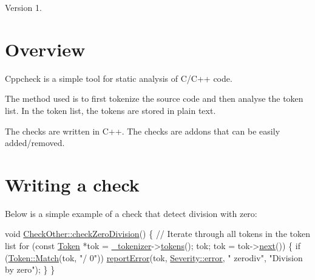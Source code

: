 \begin{DoxyVersion}{Version}
1.
\end{DoxyVersion}
\hypertarget{index_overview_sec}{}\section{Overview}\label{index_overview_sec}
Cppcheck is a simple tool for static analysis of C/\-C++ code.

The method used is to first tokenize the source code and then analyse the token list. In the token list, the tokens are stored in plain text.

The checks are written in C++. The checks are addons that can be easily added/removed.\hypertarget{index_writing_checks_sec}{}\section{Writing a check}\label{index_writing_checks_sec}
Below is a simple example of a check that detect division with zero\-: 
\begin{DoxyCode}
\textcolor{keywordtype}{void} \hyperlink{class_check_other_a9e3e6d91a89fb71585872113b0ccece5}{CheckOther::checkZeroDivision}()
\{
    \textcolor{comment}{// Iterate through all tokens in the token list}
    \textcolor{keywordflow}{for} (\textcolor{keyword}{const} \hyperlink{class_token}{Token} *tok = \hyperlink{class_check_af177003f600a2f1a22c48b9fd2c4d579}{\_tokenizer}->\hyperlink{class_tokenizer_a5f932706a5d3bb6ddc0b68634005300d}{tokens}(); tok; tok
       = tok->\hyperlink{class_token_a64b1ca2e4b29a1075f8913e037c2d76e}{next}())
    \{
        \textcolor{keywordflow}{if} (\hyperlink{class_token_a519623098bde6496825e49364575dadf}{Token::Match}(tok, \textcolor{stringliteral}{"/ 0"}))
            \hyperlink{class_check_a209cad3fc1f9889b3edc72ae027846af}{reportError}(tok, \hyperlink{class_severity_ac185938ae084355bbf1790cf1a70caa6ae24df992f36773de88bd9d04501e2a22}{Severity::error}, \textcolor{stringliteral}{"
      zerodiv"}, \textcolor{stringliteral}{"Division by zero"});
    \}
\}
\end{DoxyCode}


